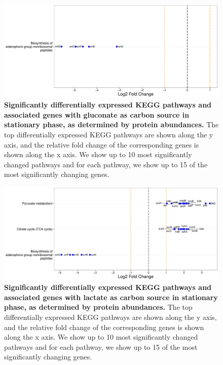\documentclass[a4paper]{article}
\begin{document}
\clearpage
\begin{figure}
	\includegraphics[width=1.0\textwidth]{../../d_figures/kegg_07.pdf}
	\caption[Significantly altered KEGG pathways for protein samples in stationary phase tested for gluconate against glucose]
	{\textbf{Significantly differentially expressed KEGG pathways and associated genes with gluconate as carbon source in stationary phase, as determined by protein abundances.} The top differentially expressed KEGG pathways are shown along the y axis, and the relative fold change of the corresponding genes is shown along the x axis. We show up to 10 most significantly changed pathways and for each pathway, we show up to 15 of the most significantly changing genes.}
\end{figure}

\clearpage
\begin{figure}
	\includegraphics[width=1.0\textwidth]{../../d_figures/kegg_08.pdf}
	\caption[Significantly altered KEGG pathways for protein samples in stationary phase tested for lactate against glucose]
	{\textbf{Significantly differentially expressed KEGG pathways and associated genes with lactate as carbon source in stationary phase, as determined by protein abundances.} The top differentially expressed KEGG pathways are shown along the y axis, and the relative fold change of the corresponding genes is shown along the x axis. We show up to 10 most significantly changed pathways and for each pathway, we show up to 15 of the most significantly changing genes.}
\end{figure}
\end{document}
